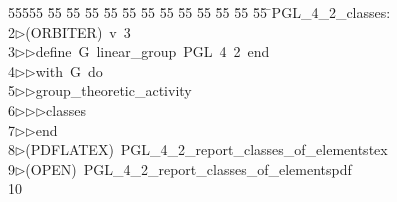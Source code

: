 %
%
\begin{tabbing}
55555 \= 55 \= 55 \= 55 \= 55 \= 55 \= 55 \= 55 \= 55 \= 55 \= 55 \= 55 \= 55 \= \>PGL\_4\_2\_classes:\\[0pt]
2\>$\triangleright$\>(ORBITER)\ v\ 3\ \\[0pt]
3\>$\triangleright$\>$\triangleright$\>define\ G\ linear\_group\ PGL\ 4\ 2\ end\ \\[0pt]
4\>$\triangleright$\>$\triangleright$\>with\ G\ do\ \\[0pt]
5\>$\triangleright$\>$\triangleright$\>group\_theoretic\_activity\ \\[0pt]
6\>$\triangleright$\>$\triangleright$\>$\triangleright$\>classes\ \\[0pt]
7\>$\triangleright$\>$\triangleright$\>end\\[0pt]
8\>$\triangleright$\>(PDFLATEX)\ PGL\_4\_2\_report\_classes\_of\_elementstex\\[0pt]
9\>$\triangleright$\>(OPEN)\ PGL\_4\_2\_report\_classes\_of\_elementspdf\\[0pt]
10\>\end{tabbing}
